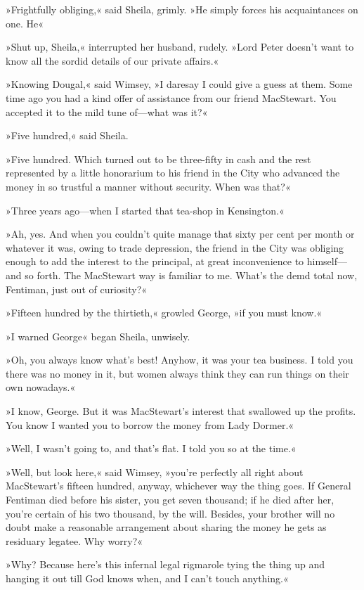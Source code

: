 »Frightfully obliging,« said Sheila, grimly. »He simply forces his acquaintances on one. He\longdash«

»Shut up, Sheila,« interrupted her husband, rudely. »Lord Peter doesn't want to know all the sordid details of our private affairs.«

»Knowing Dougal,« said Wimsey, »I daresay I could give a guess at them. Some time ago you had a kind offer of assistance from our friend MacStewart. You accepted it to the mild tune of—what was it?«

»Five hundred,« said Sheila.

»Five hundred. Which turned out to be three-fifty in cash and the rest represented by a little honorarium to his friend in the City who advanced the money in so trustful a manner without security. When was that?«

»Three years ago—when I started that tea-shop in Kensington.«

»Ah, yes. And when you couldn't quite manage that sixty per cent per month or whatever it was, owing to trade depression, the friend in the City was obliging enough to add the interest to the principal, at great inconvenience to himself—and so forth. The MacStewart way is familiar to me. What's the demd total now, Fentiman, just out of curiosity?«

»Fifteen hundred by the thirtieth,« growled George, »if you must know.«

»I warned George\longdash« began Sheila, unwisely.

»Oh, you always know what's best! Anyhow, it was your tea business. I told you there was no money in it, but women always think they can run things on their own nowadays.«

»I know, George. But it was MacStewart's interest that swallowed up the profits. You know I wanted you to borrow the money from Lady Dormer.«

»Well, I wasn't going to, and that's flat. I told you so at the time.«

»Well, but look here,« said Wimsey, »you're perfectly all right about MacStewart's fifteen hundred, anyway, whichever way the thing goes. If General Fentiman died before his sister, you get seven thousand; if he died after her, you're certain of his two thousand, by the will. Besides, your brother will no doubt make a reasonable arrangement about sharing the money he gets as residuary legatee. Why worry?«

»Why? Because here's this infernal legal rigmarole tying the thing up and hanging it out till God knows when, and I can't touch anything.«

